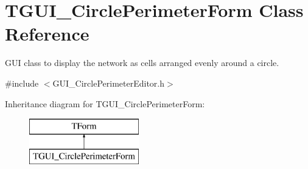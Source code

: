 \hypertarget{class_t_g_u_i___circle_perimeter_form}{\section{T\+G\+U\+I\+\_\+\+Circle\+Perimeter\+Form Class Reference}
\label{class_t_g_u_i___circle_perimeter_form}
}


G\+U\+I class to display the network as cells arranged evenly around a circle.  




{\ttfamily \#include $<$G\+U\+I\+\_\+\+Circle\+Perimeter\+Editor.\+h$>$}

Inheritance diagram for T\+G\+U\+I\+\_\+\+Circle\+Perimeter\+Form\+:\begin{figure}[H]
\begin{center}
\leavevmode
\includegraphics[height=2.000000cm]{class_t_g_u_i___circle_perimeter_form}
\end{center}
\end{figure}
